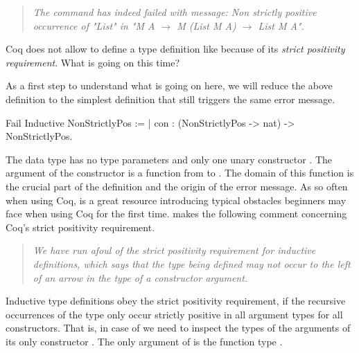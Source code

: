 \begin{quote}
\emph{The command has indeed failed with message:
Non strictly positive occurrence of "List" in "M A $\rightarrow$ M (List M A) $\rightarrow$ List M A".}
\end{quote}

Coq does not allow to define a type definition like  because of its \emph{strict positivity requirement}.
What is going on this time?

As a first step to understand what is going on here, we will reduce the above definition to the simplest definition that still triggers the same error message.

\begin{coqcode}
Fail Inductive NonStrictlyPos :=
| con : (NonStrictlyPos -> nat) -> NonStrictlyPos.
\end{coqcode}

The data type  has no type parameters and only one unary constructor .
The argument of the constructor  is a function from  to .
The domain of this function is the crucial part of the definition and the origin of the error message.
As so often when using Coq, \citet{chlipala2013certified} is a great resource introducing typical obstacles beginners may face when using Coq for the first time.
\citeauthor{chlipala2013certified} makes the following comment concerning Coq's strict positivity requirement.

\begin{quote}
\emph{We have run afoul of the strict positivity requirement for inductive definitions, which says that the type being defined may not occur to the left of an arrow in the type of a constructor argument.}
\end{quote}

Inductive type definitions obey the strict positivity requirement, if the recursive occurrences of the type only occur strictly positive in all argument types for all constructors.
That is, in case of  we need to inspect the types of the arguments of its only constructor .
The only argument of  is the function type .

